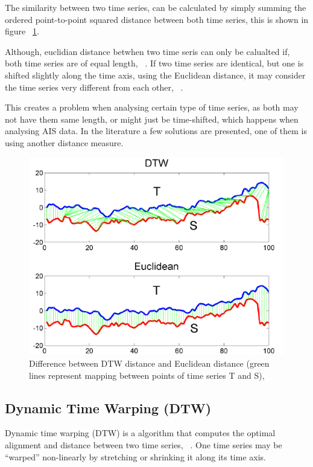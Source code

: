 The similarity between two time series, can be calculated by simply summing the ordered point-to-point squared distance between both time series, this is shown in figure ~\ref{fig:EuclidianDTW}. 

Although, euclidian distance betwhen two time seris can only be calualted if, both time series are of equal length, ~\cite{EuclidianRef}. 
If two time series are identical, but one is shifted slightly along the time axis, using the Euclidean distance, it may consider the time series very different from each other, ~\cite{Salvador2007}.

This creates a problem when analysing certain type of time series, as both may not have them same length, or might just be time-shifted, which happens when analysing AIS data. In the literature a few solutions are presented, one of them is using another distance measure. 

\begin{figure}[H]
	\centering
	\includegraphics[scale = .5]{figures/DTWEuclidean.png}
    \caption{Difference between DTW distance and Euclidean distance (green lines represent mapping between points of time series T and S),~\cite{EuclidianRef}}
    \label{fig:EuclidianDTW}
\end{figure}


\subsection{Dynamic Time Warping (DTW)}
Dynamic time warping (DTW) is a algorithm that computes the optimal alignment and distance between two time series, ~\cite{Seto2015}. One time series may be “warped” non-linearly by stretching or shrinking it along its time axis.

